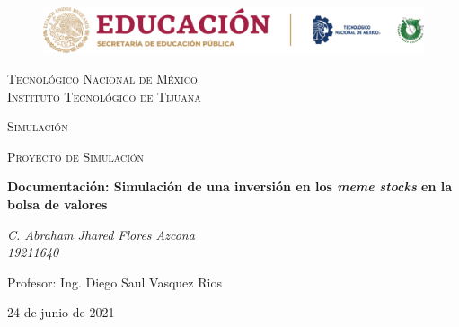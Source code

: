 \documentclass[letterpaper, 12pt]{article}
\begin{document}
    
    \begin{titlepage}
        \begin{figure}[ht]
            \centering
            \includegraphics[width=15cm]{logosITT.png}
        \end{figure}
        \centering
        {\scshape\LARGE Tecnológico Nacional de México\\Instituto Tecnológico de Tijuana\par}
        \vspace{1cm}
        {\scshape\Large Simulación\par}
        \vspace{1cm}
        {\scshape\Large Proyecto de Simulación\par}
        \vspace{1.5cm}
        {\huge\bfseries Documentación: Simulación de una inversión en los \emph{meme stocks} en la bolsa de valores\par}
        \vspace{2cm}
        {\Large\itshape C. Abraham Jhared Flores Azcona\\19211640\par}
        \vfill
        Profesor: Ing. Diego Saul Vasquez Rios\par
    
        \vfill

        {\large 24 de junio de 2021}
    \end{titlepage}

    \newpage
    \thispagestyle{empty}
    \tableofcontents
    \listoffigures
\end{document}
